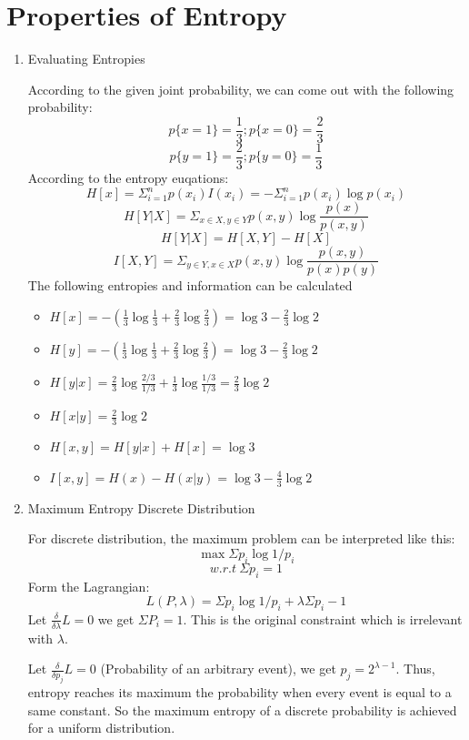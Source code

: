 \documentclass[a4paper, 12pt, titlepage]{article}
\begin{document}
\section{Properties of Entropy}
\begin{enumerate}
\item Evaluating Entropies

According to the given joint probability, we can come out with the following probability:
$$p\{x=1\} = \frac{1}{3}; p\{x=0\} = \frac{2}{3}$$
$$p\{y=1\} = \frac{2}{3}; p\{y=0\} = \frac{1}{3}$$
According to the entropy euqations:
$$ H[x] = \Sigma_{i=1}^np(x_i)I(x_i)=-\Sigma_{i=1}^np(x_i)\log{p(x_i)}$$
$$ H[Y|X] = \Sigma_{x\in{}X, y\in{}Y}p(x,y)\log{\frac{p(x)}{p(x,y)}}$$
$$H[Y|X]=H[X,Y]-H[X]$$
$$I[X,Y] = \Sigma_{y\in{}Y, x\in{}X}p(x,y)\log{\frac{p(x,y)}{p(x)p(y)}}$$
The following entropies and information can be calculated
\begin{itemize}
    \item $H[x] = -(\frac{1}{3}\log{\frac{1}{3}}+\frac{2}{3}\log{\frac{2}{3}})=\log{3}-\frac{2}{3}\log{2}$
    \item $H[y] = -(\frac{1}{3}\log{\frac{1}{3}}+\frac{2}{3}\log{\frac{2}{3}})=\log{3}-\frac{2}{3}\log{2}$
    \item $H[y|x] = \frac{2}{3}\log{\frac{2/3}{1/3}}+\frac{1}{3}\log{\frac{1/3}{1/3}}=\frac{2}{3}\log{2}$
    \item $H[x|y] = \frac{2}{3}\log{2}$
    \item $H[x,y] = H[y|x] + H[x] = \log{3}$
    \item $I[x,y] = H(x) - H(x|y) = \log{3} - \frac{4}{3}\log{2}$
\end{itemize}
\item Maximum Entropy Discrete Distribution

For discrete distribution, the maximum problem can be interpreted like this:
$$\max{}\Sigma{}p_i\log{1/p_i}$$
$$w.r.t~\Sigma{}p_i=1$$
Form the Lagrangian:
$$L(P, \lambda) = \Sigma{}p_i\log{1/p_i} + \lambda{\Sigma{}p_i-1}$$
Let $\frac{\delta}{\delta\lambda}L=0$ we get $\Sigma{}P_i=1$. This is the original constraint which is irrelevant with $\lambda$.

Let $\frac{\delta}{\delta{}p_j}L=0$ (Probability of an arbitrary event), we get $p_j = 2^{\lambda-1}$. Thus, entropy reaches its maximum the probability when every event is equal to a same constant. So the maximum entropy of a discrete probability is achieved for a uniform distribution.


\end{enumerate}
\end{document}

